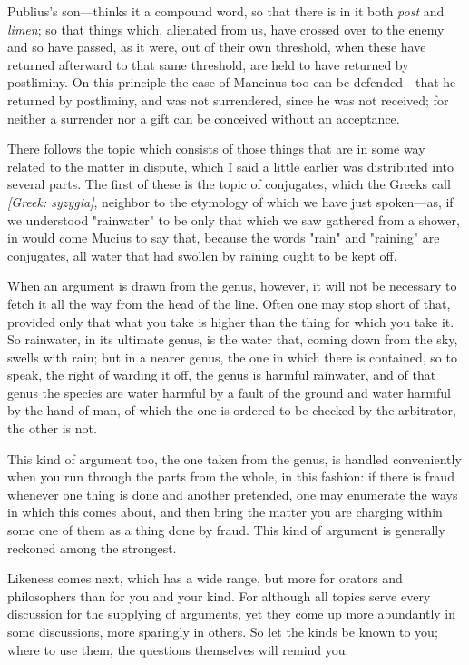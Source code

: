  Publius's son—thinks it a compound word, so that there is in it both \textit{post} and \textit{limen}; so that things which, alienated from us, have crossed over to the enemy and so have passed, as it were, out of their own threshold, when these have returned afterward to that same threshold, are held to have returned by postliminy. On this principle the case of Mancinus too can be defended—that he returned by postliminy, and was not surrendered, since he was not received; for neither a surrender nor a gift can be conceived without an acceptance.

 There follows the topic which consists of those things that are in some way related to the matter in dispute, which I said a little earlier was distributed into several parts. The first of these is the topic of conjugates, which the Greeks call \textit{[Greek: syzygia]}, neighbor to the etymology of which we have just spoken—as, if we understood "rainwater" to be only that which we saw gathered from a shower, in would come Mucius to say that, because the words "rain" and "raining" are conjugates, all water that had swollen by raining ought to be kept off.

 When an argument is drawn from the genus, however, it will not be necessary to fetch it all the way from the head of the line. Often one may stop short of that, provided only that what you take is higher than the thing for which you take it. So rainwater, in its ultimate genus, is the water that, coming down from the sky, swells with rain; but in a nearer genus, the one in which there is contained, so to speak, the right of warding it off, the genus is harmful rainwater, and of that genus the species are water harmful by a fault of the ground and water harmful by the hand of man, of which the one is ordered to be checked by the arbitrator, the other is not.

 This kind of argument too, the one taken from the genus, is handled conveniently when you run through the parts from the whole, in this fashion: if there is fraud whenever one thing is done and another pretended, one may enumerate the ways in which this comes about, and then bring the matter you are charging within some one of them as a thing done by fraud. This kind of argument is generally reckoned among the strongest.

 Likeness comes next, which has a wide range, but more for orators and philosophers than for you and your kind. For although all topics serve every discussion for the supplying of arguments, yet they come up more abundantly in some discussions, more sparingly in others. So let the kinds be known to you; where to use them, the questions themselves will remind you.

